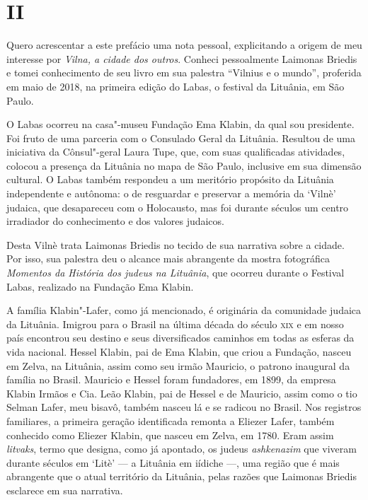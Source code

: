 \section*{II}

Quero acrescentar a este prefácio uma nota pessoal, explicitando a
origem de meu interesse por \textit{Vilna, a cidade dos outros}. Conheci
pessoalmente Laimonas Briedis e tomei conhecimento de seu livro em sua
palestra ``Vilnius e o mundo'', proferida em maio de 2018, na primeira
edição do Labas, o festival da Lituânia, em São Paulo.

O Labas ocorreu na casa"-museu Fundação Ema Klabin, da qual sou
presidente. Foi fruto de uma parceria com o Consulado Geral da Lituânia.
Resultou de uma iniciativa da Cônsul"-geral Laura Tupe, que, com suas
qualificadas atividades, colocou a presença da Lituânia no mapa de São
Paulo, inclusive em sua dimensão cultural. O Labas também respondeu a um
meritório propósito da Lituânia independente e autônoma: o de resguardar
e preservar a memória da `Vilnè' judaica, que desapareceu com o
Holocausto, mas foi durante séculos um centro irradiador do conhecimento
e dos valores judaicos.

Desta Vilnè trata Laimonas Briedis no tecido de sua narrativa sobre a
cidade. Por isso, sua palestra deu o alcance mais abrangente da mostra
fotográfica \textit{Momentos da História dos judeus na Lituânia}, que
ocorreu durante o Festival Labas, realizado na Fundação Ema Klabin.

A família Klabin"-Lafer, como já mencionado, é originária da comunidade
judaica da Lituânia. Imigrou para o Brasil na última década do século
\textsc{xix} e em nosso país encontrou seu destino e seus diversificados caminhos
em todas as esferas da vida nacional. Hessel Klabin, pai de Ema Klabin,
que criou a Fundação, nasceu em Zelva, na Lituânia, assim como seu irmão
Mauricio, o patrono inaugural da família no Brasil. Mauricio e Hessel
foram fundadores, em 1899, da empresa Klabin Irmãos e Cia. Leão Klabin,
pai de Hessel e de Mauricio, assim como o tio Selman Lafer, meu bisavô,
também nasceu lá e se radicou no Brasil. Nos registros familiares, a
primeira geração identificada remonta a Eliezer Lafer, também conhecido
como Eliezer Klabin, que nasceu em Zelva, em 1780. Eram assim
\textit{litvaks}, termo que designa, como já apontado, os judeus
\textit{ashkenazim} que viveram durante séculos em `Litè' --- a Lituânia em
iídiche ---, uma região que é mais abrangente que o atual território da
Lituânia, pelas razões que Laimonas Briedis esclarece em sua narrativa.

